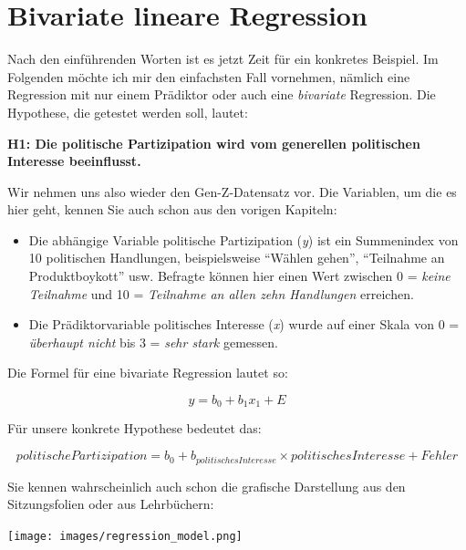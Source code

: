 \documentclass[
]{book}
\begin{document}
\hypertarget{bivariate-lineare-regression}{%
\section{Bivariate lineare Regression}\label{bivariate-lineare-regression}}

Nach den einführenden Worten ist es jetzt Zeit für ein konkretes Beispiel. Im Folgenden möchte ich mir den einfachsten Fall vornehmen, nämlich eine Regression mit nur einem Prädiktor oder auch eine \emph{bivariate} Regression. Die Hypothese, die getestet werden soll, lautet:

\textbf{H1: Die politische Partizipation wird vom generellen politischen Interesse beeinflusst.}

Wir nehmen uns also wieder den Gen-Z-Datensatz vor. Die Variablen, um die es hier geht, kennen Sie auch schon aus den vorigen Kapiteln:

\begin{itemize}
\item
  Die abhängige Variable politische Partizipation (\emph{y}) ist ein Summenindex von 10 politischen Handlungen, beispielsweise ``Wählen gehen'', ``Teilnahme an Produktboykott'' usw. Befragte können hier einen Wert zwischen 0 = \emph{keine Teilnahme} und 10 = \emph{Teilnahme an allen zehn Handlungen} erreichen.
\item
  Die Prädiktorvariable politisches Interesse (\emph{x}) wurde auf einer Skala von 0 = \emph{überhaupt nicht} bis 3 = \emph{sehr stark} gemessen.
\end{itemize}

Die Formel für eine bivariate Regression lautet so:

\[y = b_{0}+b_{1}x_{1}+E\]

Für unsere konkrete Hypothese bedeutet das:

\[politische Partizipation = b_{0}+b_{politisches Interesse} × politisches Interesse+Fehler\]

Sie kennen wahrscheinlich auch schon die grafische Darstellung aus den Sitzungsfolien oder aus Lehrbüchern:

\texttt{[image: images/regression\_model.png]}
\end{document}
